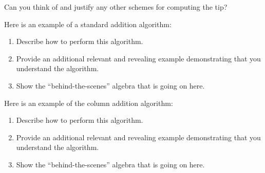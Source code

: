 \documentclass[nooutcomes]{ximera}
\begin{document}
\begin{problem}Can you think of and justify any other schemes for computing the
  tip?
\end{problem} 

\begin{problem}Here is an example of a standard addition algorithm:
\begin{image}
\end{image}
\begin{enumerate}
\item Describe how to perform this algorithm.
\item Provide an additional relevant and revealing example
  demonstrating that you understand the algorithm.
\item Show the ``behind-the-scenes'' algebra that is going on here.
\end{enumerate}
\end{problem} 

\begin{problem}Here is an example of the column addition
  algorithm:
\begin{image}
\end{image}
\begin{enumerate}
\item Describe how to perform this algorithm.
\item Provide an additional relevant and revealing example
  demonstrating that you understand the algorithm.
\item Show the ``behind-the-scenes'' algebra that is going on here.
\end{enumerate}
\end{problem} 
\end{document}
